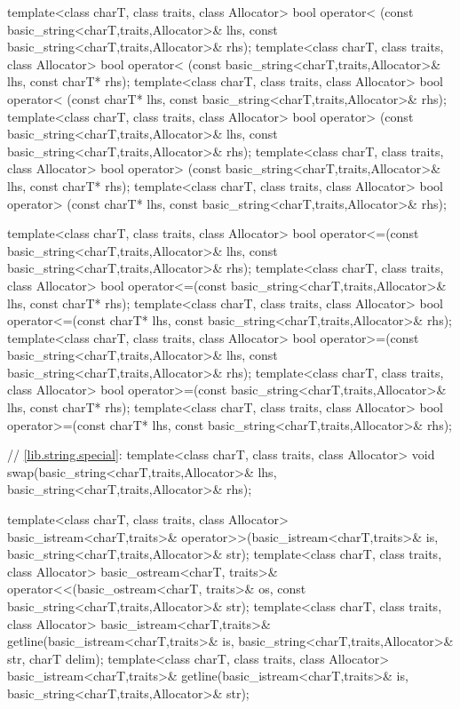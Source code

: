 \begin{codeblock}
{  template<class charT, class traits, class Allocator>
    bool operator< (const basic_string<charT,traits,Allocator>& lhs,
                    const basic_string<charT,traits,Allocator>& rhs);
  template<class charT, class traits, class Allocator>
    bool operator< (const basic_string<charT,traits,Allocator>& lhs,
                    const charT* rhs);
  template<class charT, class traits, class Allocator>
    bool operator< (const charT* lhs,
                    const basic_string<charT,traits,Allocator>& rhs);
  template<class charT, class traits, class Allocator>
    bool operator> (const basic_string<charT,traits,Allocator>& lhs,
                    const basic_string<charT,traits,Allocator>& rhs);
  template<class charT, class traits, class Allocator>
    bool operator> (const basic_string<charT,traits,Allocator>& lhs,
                    const charT* rhs);
  template<class charT, class traits, class Allocator>
    bool operator> (const charT* lhs,
                    const basic_string<charT,traits,Allocator>& rhs);

  template<class charT, class traits, class Allocator>
    bool operator<=(const basic_string<charT,traits,Allocator>& lhs,
                    const basic_string<charT,traits,Allocator>& rhs);
  template<class charT, class traits, class Allocator>
    bool operator<=(const basic_string<charT,traits,Allocator>& lhs,
                    const charT* rhs);
  template<class charT, class traits, class Allocator>
    bool operator<=(const charT* lhs,
                    const basic_string<charT,traits,Allocator>& rhs);
  template<class charT, class traits, class Allocator>
    bool operator>=(const basic_string<charT,traits,Allocator>& lhs,
                    const basic_string<charT,traits,Allocator>& rhs);
  template<class charT, class traits, class Allocator>
    bool operator>=(const basic_string<charT,traits,Allocator>& lhs,
                    const charT* rhs);
  template<class charT, class traits, class Allocator>
    bool operator>=(const charT* lhs,
                    const basic_string<charT,traits,Allocator>& rhs);

  // \ref{lib.string.special}:
  template<class charT, class traits, class Allocator>
     void swap(basic_string<charT,traits,Allocator>& lhs,
               basic_string<charT,traits,Allocator>& rhs);

  template<class charT, class traits, class Allocator>
   basic_istream<charT,traits>&
    operator>>(basic_istream<charT,traits>& is,
               basic_string<charT,traits,Allocator>& str);
  template<class charT, class traits, class Allocator>
   basic_ostream<charT, traits>&
    operator<<(basic_ostream<charT, traits>& os,
               const basic_string<charT,traits,Allocator>& str);
  template<class charT, class traits, class Allocator>
   basic_istream<charT,traits>&
     getline(basic_istream<charT,traits>& is,
             basic_string<charT,traits,Allocator>& str,
             charT delim);
  template<class charT, class traits, class Allocator>
   basic_istream<charT,traits>&
     getline(basic_istream<charT,traits>& is,
             basic_string<charT,traits,Allocator>& str);

}
\end{codeblock}
